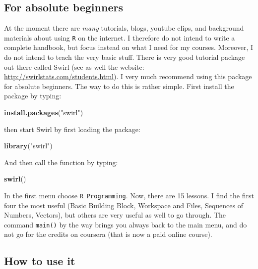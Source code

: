 \documentclass[]{article}
\newenvironment{Shaded}{\begin{snugshade}}{\end{snugshade}}
\newcommand{\KeywordTok}[1]{\textcolor[rgb]{0.13,0.29,0.53}{\textbf{{#1}}}}
\newcommand{\StringTok}[1]{\textcolor[rgb]{0.31,0.60,0.02}{{#1}}}
\newcommand{\NormalTok}[1]{{#1}}
\begin{document}
\subsection{For absolute beginners}\label{for-absolute-beginners}

At the moment there are \emph{many} tutorials, blogs, youtube clips, and
background materials about using \texttt{R} on the internet. I therefore
do not intend to write a complete handbook, but focus instead on what I
need for my courses. Moreover, I do not intend to teach the very basic
stuff. There is very good tutorial package out there called Swirl (see
as well the website: \url{http://swirlstats.com/students.html}). I very
much recommend using this package for absolute beginners. The way to do
this is rather simple. First install the package by typing:

\begin{Shaded}
\begin{Highlighting}[]
\KeywordTok{install.packages}\NormalTok{(}\StringTok{"swirl"}\NormalTok{)}
\end{Highlighting}
\end{Shaded}

then start Swirl by first loading the package:

\begin{Shaded}
\begin{Highlighting}[]
\KeywordTok{library}\NormalTok{(}\StringTok{"swirl"}\NormalTok{)}
\end{Highlighting}
\end{Shaded}

And then call the function by typing:

\begin{Shaded}
\begin{Highlighting}[]
\KeywordTok{swirl}\NormalTok{()}
\end{Highlighting}
\end{Shaded}

In the first menu choose \texttt{R\ Programming}. Now, there are 15
lessons. I find the first four the most useful (Basic Building Block,
Workspace and Files, Sequences of Numbers, Vectors), but others are very
useful as well to go through. The command \texttt{main()} by the way
brings you always back to the main menu, and do not go for the credits
on coursera (that is now a paid online course).

\subsection{How to use it}\label{how-to-use-it}
\end{document}
